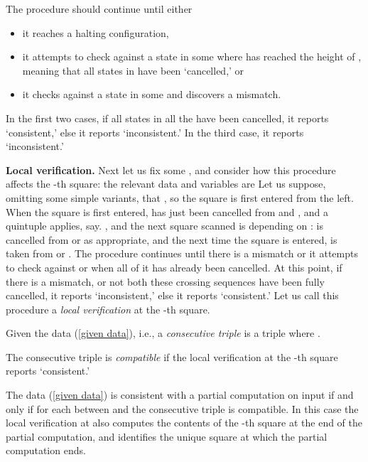 The procedure should continue until either

\begin{itemize}
\item
it reaches a halting configuration,
\item
it attempts to check  against a state in some 
where  has reached the height of , meaning
that all states in  have been `cancelled,' or
\item
it checks  against a state in some  and
discovers a mismatch.
\end{itemize}

In the first two cases, if all states in all the 
have been cancelled, it reports `consistent,' else
it reports `inconsistent.'  In the third case, it
reports `inconsistent.'

\numpara
\label{par: local verification}
{\bf Local verification.}
Next let us fix some , and consider
how this procedure affects the -th square: the relevant
data and variables are
  Let us
suppose, omitting some simple variants,
that , so the square is first entered
from the left.  When the square is first entered,
 has just been cancelled from   and ,
and a quintuple  applies, say.
 , and the next square scanned is 
depending on :  is cancelled from  or 
as appropriate, and the next time the square is entered,
 is taken from  or .  The procedure
continues until there is a mismatch
or it attempts to check  against  or 
when all of it has already been cancelled.  At this
point, if there is a mismatch, or not both these
crossing sequences have been fully cancelled, it reports
`inconsistent,' else it reports `consistent.'  Let
us call this procedure a {\em local verification} at the
-th square.

\begin{definition}
\label{def: consecutive triple}
\label{def: compatible}
Given the data (\ref{given data}), i.e.,
 a {\em consecutive triple} is a triple
 where .

The consecutive triple
 is
{\em compatible} if the local verification at the -th square
reports `consistent.'
\end{definition}

\begin{theorem}
\label{thm: nasc for consistency}
The data (\ref{given data}) is consistent with
a partial computation on input  if and only
if for each  between  and  the consecutive triple
 is compatible.  In this case
the local verification at  also computes the
contents of the -th square at the end of the
partial computation, and identifies the unique square
at which the partial computation ends.
\end{theorem}

